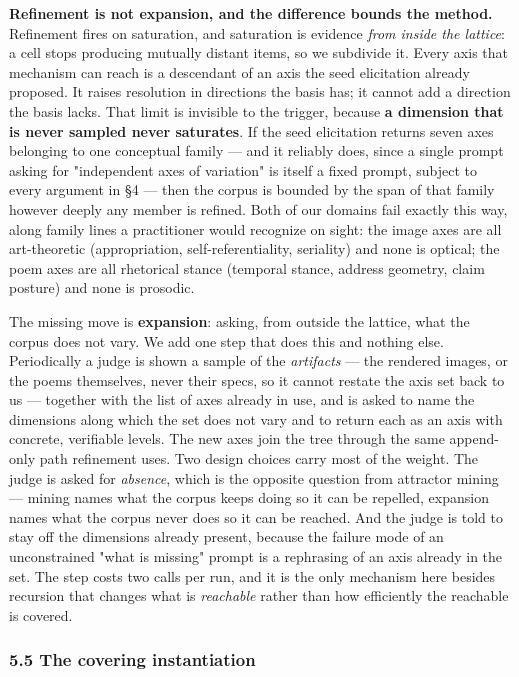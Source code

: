 \documentclass[
  10pt,
]{article}
\theoremstyle{plain}
\theoremstyle{definition}
\begin{document}
\textbf{Refinement is not expansion, and the difference bounds the
method.} Refinement fires on saturation, and saturation is evidence
\emph{from inside the lattice}: a cell stops producing mutually distant
items, so we subdivide it. Every axis that mechanism can reach is a
descendant of an axis the seed elicitation already proposed. It raises
resolution in directions the basis has; it cannot add a direction the
basis lacks. That limit is invisible to the trigger, because \textbf{a
dimension that is never sampled never saturates}. If the seed
elicitation returns seven axes belonging to one conceptual family ---
and it reliably does, since a single prompt asking for "independent axes
of variation" is itself a fixed prompt, subject to every argument in §4
--- then the corpus is bounded by the span of that family however deeply
any member is refined. Both of our domains fail exactly this way, along
family lines a practitioner would recognize on sight: the image axes are
all art-theoretic (appropriation, self-referentiality, seriality) and
none is optical; the poem axes are all rhetorical stance (temporal
stance, address geometry, claim posture) and none is prosodic.

The missing move is \textbf{expansion}: asking, from outside the
lattice, what the corpus does not vary. We add one step that does this
and nothing else. Periodically a judge is shown a sample of the
\emph{artifacts} --- the rendered images, or the poems themselves, never
their specs, so it cannot restate the axis set back to us --- together
with the list of axes already in use, and is asked to name the
dimensions along which the set does not vary and to return each as an
axis with concrete, verifiable levels. The new axes join the tree
through the same append-only path refinement uses. Two design choices
carry most of the weight. The judge is asked for \emph{absence}, which
is the opposite question from attractor mining --- mining names what the
corpus keeps doing so it can be repelled, expansion names what the
corpus never does so it can be reached. And the judge is told to stay
off the dimensions already present, because the failure mode of an
unconstrained "what is missing" prompt is a rephrasing of an axis
already in the set. The step costs two calls per run, and it is the only
mechanism here besides recursion that changes what is \emph{reachable}
rather than how efficiently the reachable is covered.

\subsubsection{5.5 The covering
instantiation}\label{55-the-covering-instantiation}
\end{document}
